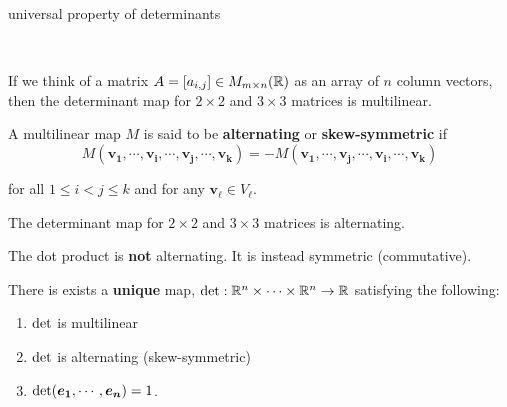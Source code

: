 \begin{problem}{universal property of determinants}
    
    \
    
    
    
    \begin{example}
    If we think of a matrix $A = [a_{i,j}] \in M_{m \times n}(\mathbb{R})$ as an array of $n$ column vectors, then the determinant map for $2 \times 2$ and $3 \times 3$ matrices is multilinear.
    \end{example}
    
    
    
    
    
    \begin{definition}
    A multilinear map $M$ is said to be \textbf{alternating} or \textbf{skew-symmetric} if 
    $$M(\bm{v_1}, \cdots, \bm{v_i}, \cdots , \bm{v_j}, \cdots, \bm{v_k}) = -M(\bm{v_1}, \cdots, \bm{v_j}, \cdots , \bm{v_i}, \cdots, \bm{v_k}) $$
    
    for all $1 \leq i < j \leq k$ and for any $\bm{v_\ell} \in V_\ell$.
    
    \end{definition}
    
    \begin{example}
    The determinant map for $2 \times 2$ and $3 \times 3$ matrices is alternating.
    \end{example}
    
    \begin{example}
    The dot product is \textbf{not} alternating.  It is instead symmetric (commutative).
    \end{example}
    
    \begin{definition}
There is exists a \textbf{unique} map, $\textnormal{det} : \mathbb{R}^n \times \cdots \times \mathbb{R}^n \to \mathbb{R}$ satisfying the following:
\begin{enumerate}
    \item $\textnormal{det}$ is multilinear
    \item $\textnormal{det}$ is alternating (skew-symmetric)
    \item $\textnormal{det}(\bm{e_1}, \cdots, \bm{e_n}) = 1$.
\end{enumerate}


\end{definition}
    
\end{problem}

